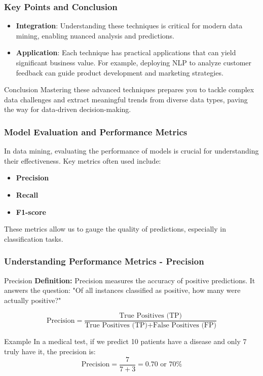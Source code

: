 \documentclass{beamer}
\begin{document}
\begin{frame}[fragile]
    \frametitle{Key Points and Conclusion}
    \begin{itemize}
        \item \textbf{Integration}: Understanding these techniques is critical for modern data mining, enabling nuanced analysis and predictions.
        \item \textbf{Application}: Each technique has practical applications that can yield significant business value. For example, deploying NLP to analyze customer feedback can guide product development and marketing strategies.
    \end{itemize}
    \begin{block}{Conclusion}
        Mastering these advanced techniques prepares you to tackle complex data challenges and extract meaningful trends from diverse data types, paving the way for data-driven decision-making.
    \end{block}
\end{frame}

\begin{frame}[fragile]
    \frametitle{Model Evaluation and Performance Metrics}
    In data mining, evaluating the performance of models is crucial for understanding their effectiveness. Key metrics often used include:
    \begin{itemize}
        \item \textbf{Precision}
        \item \textbf{Recall}
        \item \textbf{F1-score}
    \end{itemize}
    These metrics allow us to gauge the quality of predictions, especially in classification tasks.
\end{frame}

\begin{frame}[fragile]
    \frametitle{Understanding Performance Metrics - Precision}
    \begin{block}{Precision}
        \textbf{Definition:} Precision measures the accuracy of positive predictions. It answers the question: "Of all instances classified as positive, how many were actually positive?"
    \end{block}
    \begin{equation}
        \text{Precision} = \frac{\text{True Positives (TP)}}{\text{True Positives (TP)} + \text{False Positives (FP)}}
    \end{equation}
    \begin{block}{Example}
        In a medical test, if we predict 10 patients have a disease and only 7 truly have it, the precision is:
        \begin{equation}
            \text{Precision} = \frac{7}{7 + 3} = 0.70 \text{ or } 70\%
        \end{equation}
    \end{block}
\end{frame}
\end{document}
